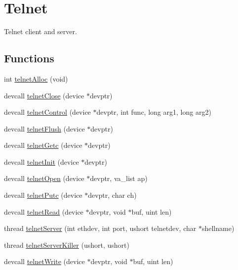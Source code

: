 \hypertarget{group__telnet}{\section{Telnet}
\label{group__telnet}
}


Telnet client and server.  


\subsection*{Functions}
\begin{DoxyCompactItemize}
\item 
int \hyperlink{group__telnet_gac6275dc15f7326cee7558eb5099699c8}{telnet\-Alloc} (void)
\item 
devcall \hyperlink{group__telnet_gaf11f2a3c50db59f20a6bbef609c3635e}{telnet\-Close} (device $\ast$devptr)
\item 
devcall \hyperlink{group__telnet_ga46e44906834260f64f54c101fea305d4}{telnet\-Control} (device $\ast$devptr, int func, long arg1, long arg2)
\item 
devcall \hyperlink{group__telnet_ga37878c46c1bab28512d6dbc63b42539a}{telnet\-Flush} (device $\ast$devptr)
\item 
devcall \hyperlink{group__telnet_gad7d501c26676645bce3b79da796b0681}{telnet\-Getc} (device $\ast$devptr)
\item 
devcall \hyperlink{group__telnet_gacd40f10d07036f6a23119b8490516faa}{telnet\-Init} (device $\ast$devptr)
\item 
devcall \hyperlink{group__telnet_gaac132307774b3f1c32a989c16e08aae9}{telnet\-Open} (device $\ast$devptr, va\-\_\-list ap)
\item 
devcall \hyperlink{group__telnet_ga70f7c4c1ddb37861db221070ffb7d17b}{telnet\-Putc} (device $\ast$devptr, char ch)
\item 
devcall \hyperlink{group__telnet_ga609c7f28d7476d70a4ceac12a2fa3c2d}{telnet\-Read} (device $\ast$devptr, void $\ast$buf, uint len)
\item 
thread \hyperlink{group__telnet_gacf4a94044cdb14e723670cb51ed3cf9c}{telnet\-Server} (int ethdev, int port, ushort telnetdev, char $\ast$shellname)
\item 
thread \hyperlink{group__telnet_gadfcfa991f72f84777e8a0b5280bde25a}{telnet\-Server\-Killer} (ushort, ushort)
\item 
devcall \hyperlink{group__telnet_ga4be4bfecd9f11589f35e3ea64d5aa6bc}{telnet\-Write} (device $\ast$devptr, void $\ast$buf, uint len)
\end{DoxyCompactItemize}


